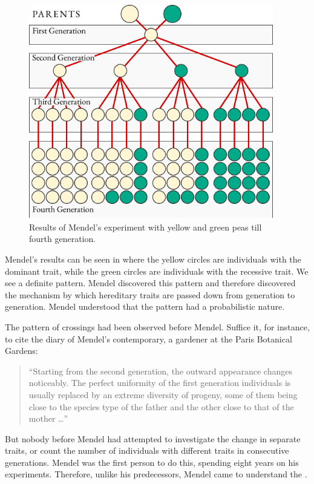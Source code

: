 \begin{figure}[!ht]
\centering
\includegraphics[width=0.95\textwidth]{figures/mendel-expt.pdf}
\caption{Results of Mendel's experiment with yellow and green peas till fourth generation.\label{mendel-expt}}
\end{figure}

Mendel's results can be seen in  where the yellow circles are
individuals with the dominant trait, while the green circles are
individuals with the recessive trait. We see a definite pattern. Mendel
discovered this pattern and therefore discovered the mechanism by
which hereditary traits are passed down from generation to generation.
Mendel understood that the pattern had a probabilistic nature.


The pattern of crossings had been observed before Mendel. Suffice it,
for instance, to cite the diary of Mendel's contemporary, a gardener at
the Paris Botanical Gardens: 
\begin{quote}
``Starting from the second generation, the outward appearance changes noticeably. The perfect uniformity of the first generation individuals is usually replaced by an extreme diversity of progeny, some of them being close to the species type of the father and the other close to that of the mother \ldots'' 
\end{quote}
But nobody before Mendel had attempted to investigate the change in separate traits, or count the number of individuals with different traits in consecutive generations. Mendel was the first person to do this, spending eight years on his
experiments. Therefore, unlike his predecessors, Mendel came to
understand the .

